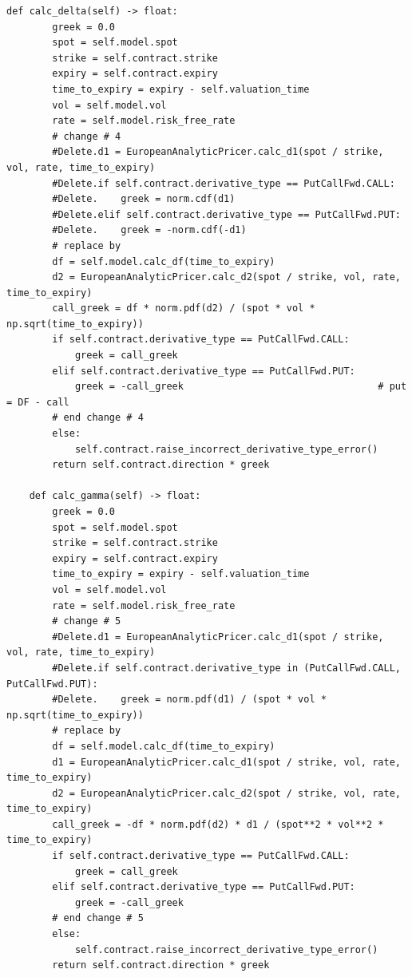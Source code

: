 \documentclass[11pt,a4paper]{article}
\begin{document}
\begin{lstlisting}[style=prof]
    def calc_delta(self) -> float:
        greek = 0.0
        spot = self.model.spot
        strike = self.contract.strike
        expiry = self.contract.expiry
        time_to_expiry = expiry - self.valuation_time
        vol = self.model.vol
        rate = self.model.risk_free_rate
        # change # 4
        #Delete.d1 = EuropeanAnalyticPricer.calc_d1(spot / strike, vol, rate, time_to_expiry)
        #Delete.if self.contract.derivative_type == PutCallFwd.CALL:
        #Delete.    greek = norm.cdf(d1)
        #Delete.elif self.contract.derivative_type == PutCallFwd.PUT:
        #Delete.    greek = -norm.cdf(-d1)
        # replace by
        df = self.model.calc_df(time_to_expiry)
        d2 = EuropeanAnalyticPricer.calc_d2(spot / strike, vol, rate, time_to_expiry)
        call_greek = df * norm.pdf(d2) / (spot * vol * np.sqrt(time_to_expiry))
        if self.contract.derivative_type == PutCallFwd.CALL:
            greek = call_greek
        elif self.contract.derivative_type == PutCallFwd.PUT:
            greek = -call_greek                                  # put = DF - call
        # end change # 4
        else:
            self.contract.raise_incorrect_derivative_type_error()
        return self.contract.direction * greek

    def calc_gamma(self) -> float:
        greek = 0.0
        spot = self.model.spot
        strike = self.contract.strike
        expiry = self.contract.expiry
        time_to_expiry = expiry - self.valuation_time
        vol = self.model.vol
        rate = self.model.risk_free_rate
        # change # 5
        #Delete.d1 = EuropeanAnalyticPricer.calc_d1(spot / strike, vol, rate, time_to_expiry)
        #Delete.if self.contract.derivative_type in (PutCallFwd.CALL, PutCallFwd.PUT):
        #Delete.    greek = norm.pdf(d1) / (spot * vol * np.sqrt(time_to_expiry))
        # replace by
        df = self.model.calc_df(time_to_expiry)
        d1 = EuropeanAnalyticPricer.calc_d1(spot / strike, vol, rate, time_to_expiry)
        d2 = EuropeanAnalyticPricer.calc_d2(spot / strike, vol, rate, time_to_expiry)
        call_greek = -df * norm.pdf(d2) * d1 / (spot**2 * vol**2 * time_to_expiry)
        if self.contract.derivative_type == PutCallFwd.CALL:
            greek = call_greek
        elif self.contract.derivative_type == PutCallFwd.PUT:
            greek = -call_greek
        # end change # 5
        else:
            self.contract.raise_incorrect_derivative_type_error()
        return self.contract.direction * greek


\end{lstlisting}
\end{document}
